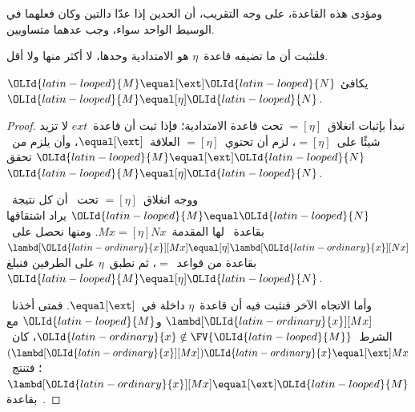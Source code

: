 \documentclass[../../../include/open-logic-section]{subfiles}
\begin{document}
ومؤدى هذه القاعدة، على وجه التقريب، أن الحدين إذا عدّا دالتين وكان
فعلهما في الوسيط الواحد سواء، وجب عدهما متساويين.

فلنثبت أن ما تضيفه قاعدة~$\eta$ هو الامتدادية وحدها، لا أكثر منها ولا أقل.

\begin{thm}
  $\OLId{latin-looped}{M} \equal[\ext] \OLId{latin-looped}{N}$ يكافئ~$\OLId{latin-looped}{M} \equal[\eta] \OLId{latin-looped}{N}$.
\end{thm}

\begin{proof}
  نبدأ بإثبات انغلاق~$\equal[\eta]$ تحت قاعدة الامتدادية؛ فإذا ثبت
  أن قاعدة~$ext$ لا تزيد شيئًا على~$\equal[\eta]$، لزم أن تحتوي~$\equal[\eta]$
  العلاقة~$\equal[\ext]$، وأن يلزم من~$\OLId{latin-looped}{M} \equal[\ext] \OLId{latin-looped}{N}$ تحقق~$\OLId{latin-looped}{M}
  \equal[\eta] \OLId{latin-looped}{N}$.

  ووجه انغلاق~$\equal[\eta]$ تحت~\ext{} أن كل نتيجة~$\OLId{latin-looped}{M} \equal \OLId{latin-looped}{N}$
  يراد اشتقاقها بقاعدة~\ext{} لها المقدمة~$Mx \equal[\eta] Nx$.
  ومنها نحصل على~$\lambd[\OLId{latin-ordinary}{x}][Mx] \equal[\eta] \lambd[\OLId{latin-ordinary}{x}][Nx]$
  بقاعدة من قواعد~$\equal$، ثم نطبق~$\eta$ على الطرفين فنبلغ~$\OLId{latin-looped}{M} \equal[\eta] \OLId{latin-looped}{N}$.

  وأما الاتجاه الآخر فنثبت فيه أن قاعدة~$\eta$ داخلة في~$\equal[\ext]$.
  فمتى أخذنا~$\lambd[\OLId{latin-ordinary}{x}][Mx]$ و$\OLId{latin-looped}{M}$ مع الشرط~$\OLId{latin-ordinary}{x} \notin \FV{\OLId{latin-looped}{M}}$،
  كان~$(\lambd[\OLId{latin-ordinary}{x}][Mx])\OLId{latin-ordinary}{x} \equal[\ext] Mx$؛
  فتنتج~$\lambd[\OLId{latin-ordinary}{x}][Mx] \equal[\ext] \OLId{latin-looped}{M}$ بقاعدة~\ext{}.
\end{proof}
\end{document}
